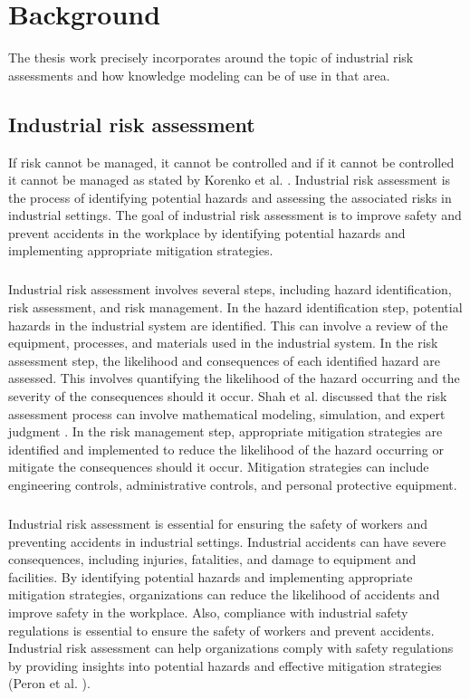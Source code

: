 \chapter{Background} \label{background}

\bigskip \bigskip The thesis work precisely incorporates around the topic of industrial risk assessments and how knowledge modeling can be of use in that area. 

\section{Industrial risk assessment} \label{ira}
If risk cannot be managed, it cannot be controlled and if it cannot be controlled it cannot be managed as stated by Korenko et al. \cite{Korenko}. Industrial risk assessment is the process of identifying potential hazards and assessing the associated risks in industrial settings. The goal of industrial risk assessment is to improve safety and prevent accidents in the workplace by identifying potential hazards and implementing appropriate mitigation strategies. 

\paragraph{} Industrial risk assessment involves several steps, including hazard identification, risk assessment, and risk management. In the hazard identification step, potential hazards in the industrial system are identified. This can involve a review of the equipment, processes, and materials used in the industrial system. In the risk assessment step, the likelihood and consequences of each identified hazard are assessed. This involves quantifying the likelihood of the hazard occurring and the severity of the consequences should it occur. Shah et al. discussed that the risk assessment process can involve mathematical modeling, simulation, and expert judgment \cite{LAShah}. In the risk management step, appropriate mitigation strategies are identified and implemented to reduce the likelihood of the hazard occurring or mitigate the consequences should it occur. Mitigation strategies can include engineering controls, administrative controls, and personal protective equipment.

\paragraph{} Industrial risk assessment is essential for ensuring the safety of workers and preventing accidents in industrial settings. Industrial accidents can have severe consequences, including injuries, fatalities, and damage to equipment and facilities. By identifying potential hazards and implementing appropriate mitigation strategies, organizations can reduce the likelihood of accidents and improve safety in the workplace. Also, compliance with industrial safety regulations is essential to ensure the safety of workers and prevent accidents. Industrial risk assessment can help organizations comply with safety regulations by providing insights into potential hazards and effective mitigation strategies (Peron et al. \cite{https://doi.org/10.1111/risa.14010}).

